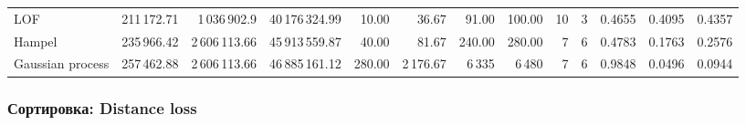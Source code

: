 \documentclass[a4paper,12pt]{report}
\begin{document}
\begin{table}[H]
\begin{tabular}{lrrrrrrrrrrrr}
LOF & 211\,172.71 & 1\,036\,902.9 & 40\,176\,324.99 & 10.00 & 36.67 & 91.00 & 100.00 & 10 & 3 & 0.4655 & 0.4095 & 0.4357 \\
Hampel & 235\,966.42 & 2\,606\,113.66 & 45\,913\,559.87 & 40.00 & 81.67 & 240.00 & 280.00 & 7 & 6 & 0.4783 & 0.1763 & 0.2576 \\
Gaussian process & 257\,462.88 & 2\,606\,113.66 & 46\,885\,161.12 & 280.00 & 2\,176.67 & 6\,335 & 6\,480 & 7 & 6 & 0.9848 & 0.0496 & 0.0944 \\
\bottomrule
\end{tabular}
\end{table}

\subsubsection{Сортировка: Distance loss}
\end{document}
